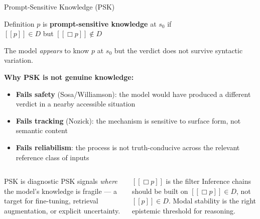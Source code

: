 \documentclass[aspectratio=169,9pt]{beamer}
\newcommand{\semp}{[\![p]\!]}
\begin{document}
\begin{frame}{Prompt-Sensitive Knowledge (PSK)}

  \begin{alertblock}{Definition}
    $p$ is \textbf{prompt-sensitive knowledge} at $s_0$ if\\[4pt]
    \hspace{2em}$\semp \in D$ \quad but \quad $[\![\Box p]\!] \notin D$
  \end{alertblock}

  \medskip

  The model \emph{appears} to know $p$ at $s_0$ but the verdict does not survive
  syntactic variation.

  \bigskip

  \textbf{Why PSK is not genuine knowledge:}
  \small
  \begin{itemize}\setlength\itemsep{3pt}
    \item \textbf{Fails safety} (Sosa/Williamson): the model would have produced
          a different verdict in a nearby accessible situation
    \item \textbf{Fails tracking} (Nozick): the mechanism is sensitive to
          surface form, not semantic content
    \item \textbf{Fails reliabilism}: the process is not truth-conducive across
          the relevant reference class of inputs
  \end{itemize}

  \medskip\pause

  \begin{columns}[T]
    \begin{block}{PSK is diagnostic}
      PSK signals \emph{where} the model's knowledge is fragile — a target for
      fine-tuning, retrieval augmentation, or explicit uncertainty.
    \end{block}
    \begin{block}{$[\![\Box p]\!]$ is the filter}
      Inference chains should be built on $[\![\Box p]\!] \in D$, not
      $\semp \in D$.
      Modal stability is the right epistemic threshold for reasoning.
    \end{block}
  \end{columns}

\end{frame}
\end{document}

